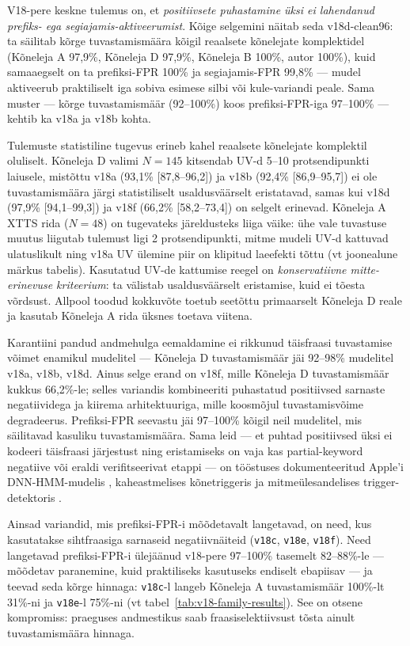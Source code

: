 V18-pere keskne tulemus on, et \emph{positiivsete puhastamine üksi ei lahendanud prefiks- ega segiajamis-aktiveerumist}. Kõige selgemini näitab seda v18d-clean96: ta säilitab kõrge tuvastamismäära kõigil reaalsete kõnelejate komplektidel (Kõneleja A 97,9\%, Kõneleja D 97,9\%, Kõneleja B 100\%, autor 100\%), kuid samaaegselt on ta prefiksi-FPR 100\% ja segiajamis-FPR 99,8\% --- mudel aktiveerub praktiliselt iga sobiva esimese silbi või kule-variandi peale. Sama muster --- kõrge tuvastamismäär (92--100\%) koos prefiksi-FPR-iga 97--100\% --- kehtib ka v18a ja v18b kohta.

Tulemuste statistiline tugevus erineb kahel reaalsete kõnelejate komplektil oluliselt. Kõneleja D valimi $N=145$ kitsendab UV-d 5--10 protsendipunkti laiusele, mistõttu v18a (93,1\% [87,8--96,2]) ja v18b (92,4\% [86,9--95,7]) ei ole tuvastamismäära järgi statistiliselt usaldusväärselt eristatavad, samas kui v18d (97,9\% [94,1--99,3]) ja v18f (66,2\% [58,2--73,4]) on selgelt erinevad. Kõneleja A XTTS rida ($N=48$) on tugevateks järeldusteks liiga väike: ühe vale tuvastuse muutus liigutab tulemust ligi 2 protsendipunkti, mitme mudeli UV-d kattuvad ulatuslikult ning v18a UV ülemine piir on klipitud laeefekti tõttu (vt joonealune märkus tabelis). Kasutatud UV-de kattumise reegel on \emph{konservatiivne mitte-erinevuse kriteerium}: ta välistab usaldusväärselt eristamise, kuid ei tõesta võrdsust. Allpool toodud kokkuvõte toetub seetõttu primaarselt Kõneleja D reale ja kasutab Kõneleja A rida üksnes toetava viitena.

Karantiini pandud andmehulga eemaldamine ei rikkunud täisfraasi tuvastamise võimet enamikul mudelitel --- Kõneleja D tuvastamismäär jäi 92--98\% mudelitel v18a, v18b, v18d. Ainus selge erand on v18f, mille Kõneleja D tuvastamismäär kukkus 66,2\%-le; selles variandis kombineeriti puhastatud positiivsed sarnaste negatiividega ja kiirema arhitektuuriga, mille koosmõjul tuvastamisvõime degradeerus. Prefiksi-FPR seevastu jäi 97--100\% kõigil neil mudelitel, mis säilitavad kasuliku tuvastamismäära. Sama leid --- et puhtad positiivsed üksi ei kodeeri täisfraasi järjestust ning eristamiseks on vaja kas partial-keyword negatiive või eraldi verifitseerivat etappi --- on tööstuses dokumenteeritud Apple'i DNN-HMM-mudelis \cite{shrivastava2021optimize}, kaheastmelises kõnetriggeris \cite{gruenstein2017cascade} ja mitmeülesandelises trigger-detektoris \cite{sigtia2020multitask}.

Ainsad variandid, mis prefiksi-FPR-i mõõdetavalt langetavad, on need, kus kasutatakse sihtfraasiga sarnaseid negatiivnäiteid (\texttt{v18c}, \texttt{v18e}, \texttt{v18f}). Need langetavad prefiksi-FPR-i ülejäänud v18-pere 97--100\% tasemelt 82--88\%-le --- mõõdetav paranemine, kuid praktiliseks kasutuseks endiselt ebapiisav --- ja teevad seda kõrge hinnaga: \texttt{v18c}-l langeb Kõneleja A tuvastamismäär 100\%-lt 31\%-ni ja \texttt{v18e}-l 75\%-ni (vt tabel~\ref{tab:v18-family-results}). See on otsene kompromiss: praeguses andmestikus saab fraasiselektiivsust tõsta ainult tuvastamismäära hinnaga.

